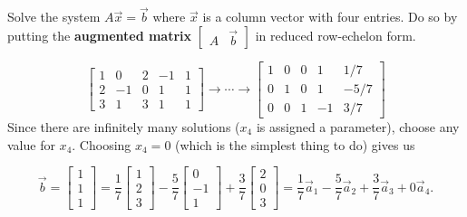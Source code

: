 \documentclass[pdf,9pt]{beamer}
\begin{document}
\begin{frame}[fragile]
    \begin{solution}
	Solve the system $A\vec{x}=\vec{b}$ where $\vec{x}$ is a column vector with
	four entries.
	\pause
	Do so by putting the {\bf augmented matrix}
	$\left[ \begin{array}{c|c} A & \vec{b} \end{array}\right]$
	in reduced row-echelon form.
	\pause

	\[ \left[\begin{array}{rrrr|r}
		1 & 0 & 2 & -1 & 1 \\
		2 & -1 & 0 & 1 & 1 \\
		3 & 1 & 3 & 1 & 1
	\end{array}\right]
	\rightarrow \cdots \rightarrow
	\left[\begin{array}{rrrr|r}
		1 & 0 & 0 & 1  & 1/7 \\
		0 & 1 & 0 & 1  & -5/7 \\
		0 & 0 & 1 & -1 & 3/7
	\end{array}\right]
    \]
    \pause
    Since there are infinitely many solutions ($x_4$ is assigned
    a parameter), choose any value for $x_4$.
    \pause
    Choosing $x_4=0$ (which is the simplest thing to do) gives us

    \[ \vec{b} = \left[\begin{array}{r} 1 \\ 1\\ 1 \end{array}\right]
    = \frac{1}{7} \left[\begin{array}{r} 1 \\ 2 \\ 3
    \end{array}\right]
    -\frac{5}{7}\left[\begin{array}{r} 0 \\ -1 \\ 1
    \end{array}\right] +
    \frac{3}{7}\left[\begin{array}{r} 2 \\ 0 \\ 3
    \end{array}\right]
    =\frac{1}{7} \vec{a}_{1} - \frac{5}{7} \vec{a}_{2} + \frac{3}{7} \vec{a}_{3} + 0 \vec{a}_{4}.\]
    \myQED
\end{solution}
\end{frame}
\end{document}
